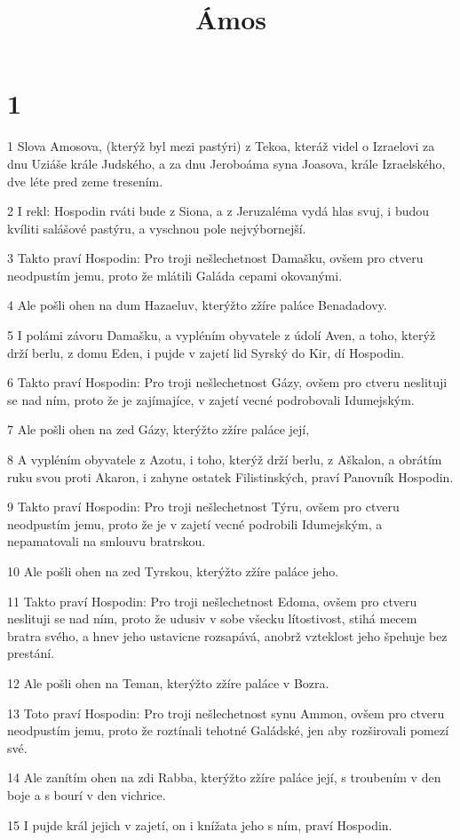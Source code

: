 

\title{Ámos}

\chapter{1}

\par 1 Slova Amosova, (kterýž byl mezi pastýri) z Tekoa, kteráž videl o Izraelovi za dnu Uziáše krále Judského, a za dnu Jeroboáma syna Joasova, krále Izraelského, dve léte pred zeme tresením.
\par 2 I rekl: Hospodin rváti bude z Siona, a z Jeruzaléma vydá hlas svuj, i budou kvíliti salášové pastýru, a vyschnou pole nejvýbornejší.
\par 3 Takto praví Hospodin: Pro troji nešlechetnost Damašku, ovšem pro ctveru neodpustím jemu, proto že mlátili Galáda cepami okovanými.
\par 4 Ale pošli ohen na dum Hazaeluv, kterýžto zžíre paláce Benadadovy.
\par 5 I polámi závoru Damašku, a vypléním obyvatele z údolí Aven, a toho, kterýž drží berlu, z domu Eden, i pujde v zajetí lid Syrský do Kir, dí Hospodin.
\par 6 Takto praví Hospodin: Pro troji nešlechetnost Gázy, ovšem pro ctveru neslituji se nad ním, proto že je zajímajíce, v zajetí vecné podrobovali Idumejským.
\par 7 Ale pošli ohen na zed Gázy, kterýžto zžíre paláce její,
\par 8 A vypléním obyvatele z Azotu, i toho, kterýž drží berlu, z Aškalon, a obrátím ruku svou proti Akaron, i zahyne ostatek Filistinských, praví Panovník Hospodin.
\par 9 Takto praví Hospodin: Pro troji nešlechetnost Týru, ovšem pro ctveru neodpustím jemu, proto že je v zajetí vecné podrobili Idumejským, a nepamatovali na smlouvu bratrskou.
\par 10 Ale pošli ohen na zed Tyrskou, kterýžto zžíre paláce jeho.
\par 11 Takto praví Hospodin: Pro troji nešlechetnost Edoma, ovšem pro ctveru neslituji se nad ním, proto že udusiv v sobe všecku lítostivost, stihá mecem bratra svého, a hnev jeho ustavicne rozsapává, anobrž vzteklost jeho špehuje bez prestání.
\par 12 Ale pošli ohen na Teman, kterýžto zžíre paláce v Bozra.
\par 13 Toto praví Hospodin: Pro troji nešlechetnost synu Ammon, ovšem pro ctveru neodpustím jemu, proto že roztínali tehotné Galádské, jen aby rozširovali pomezí své.
\par 14 Ale zanítím ohen na zdi Rabba, kterýžto zžíre paláce její, s troubením v den boje a s bourí v den vichrice.
\par 15 I pujde král jejich v zajetí, on i knížata jeho s ním, praví Hospodin.

